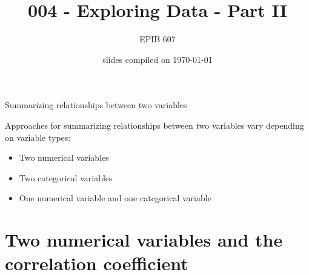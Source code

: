 \documentclass[10pt]{beamer}\usepackage[]{graphicx}\usepackage[]{color}
\begin{document}
	
	
	
	
	\title{004 - Exploring Data - Part II}
	\author{EPIB 607}
	
	\date{slides compiled on \today}
	
	\maketitle

	
	

						
\begin{frame}{Summarizing relationships between two variables}
							\protect\hypertarget{summarizing-relationships-between-two-variables}{}
							
							Approaches for summarizing relationships between two variables vary
							depending on variable types:
							
							\begin{itemize}
								\item
								Two numerical variables
								\item
								Two categorical variables
								\item
								One numerical variable and one categorical variable
							\end{itemize}
							
\end{frame}


\section{Two numerical variables and the correlation coefficient}
\end{document}
